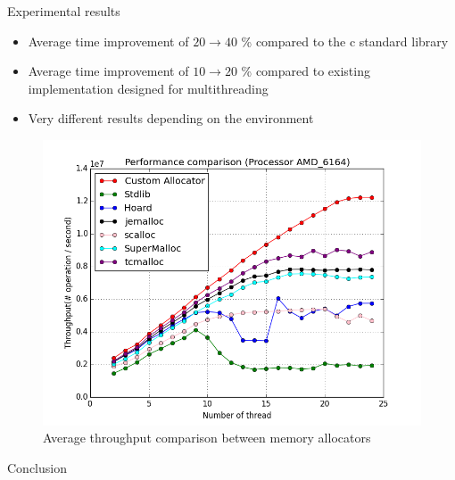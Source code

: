 \documentclass[final]{beamer}
\newlength{\onecolwid}
\begin{document}
\begin{frame}[t]
\begin{columns}[t]
\begin{column}{\onecolwid}

\begin{block}{Experimental results}
	\begin{itemize}
    	\item Average time improvement of $20 \rightarrow 40$ \% compared to the c standard library
    	\item Average time improvement of $10 \rightarrow 20$ \% compared to existing implementation designed for multithreading
		\item Very different results depending on the environment
	\end{itemize}
\begin{figure}
\includegraphics[width=0.8\linewidth]{charts/result.png}
\caption{Average throughput comparison between memory allocators}
\end{figure}

\end{block}



\begin{alertblock}{Conclusion}


\end{alertblock}
\end{column}
\end{columns}
\end{frame}
\end{document}
